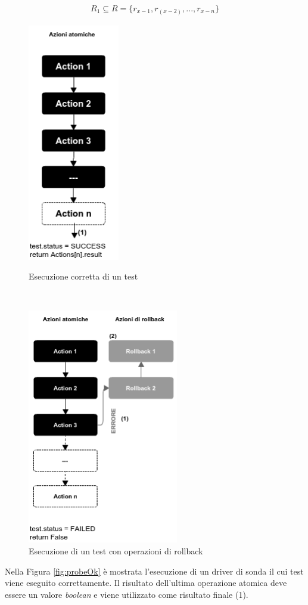 \documentclass[../main.tex]{subfiles}
\begin{document}
\begin{align*}
R_1 \subseteq R =\{ r_{x-1}, r_(x-2), ... , r_{x-n}\}
\end{align*}
\begin{figure}[H]
 \begin{minipage}[b]{6cm}
   \centering
   \includegraphics[width=4cm]{immagini/FlowchartProbeOk.png}
   \caption{Esecuzione corretta di un test}\label{fig:probeOk}
 \end{minipage}
 \ \hspace{2mm} \hspace{3mm} \
 \begin{minipage}[b]{9cm}
  \centering
   \includegraphics[width=6.6cm]{immagini/FlowchartProbeRollback.png}
   \caption{Esecuzione di un test con operazioni di rollback}\label{fig:probeRb}
 \end{minipage}
\end{figure}
Nella Figura \ref{fig:probeOk} è mostrata l'esecuzione di un driver di sonda il cui test viene eseguito correttamente.
Il risultato dell'ultima operazione atomica deve essere un valore \textit{boolean} e viene utilizzato come risultato finale (1).
\end{document}
